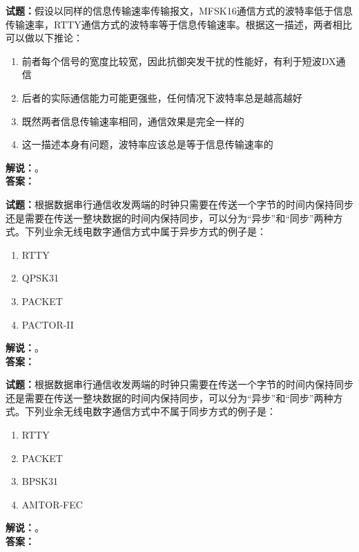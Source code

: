 \documentclass{ctexbook}
\begin{document}
\noindent\textbf{试题：}假设以同样的信息传输速率传输报文，MFSK16通信方式的波特率低于信息传输速率，RTTY通信方式的波特率等于信息传输速率。根据这一描述，两者相比可以做以下推论：
\begin{enumerate}[leftmargin=3em]
  \item 前者每个信号的宽度比较宽，因此抗御突发干扰的性能好，有利于短波DX通信
  \item 后者的实际通信能力可能更强些，任何情况下波特率总是越高越好
  \item 既然两者信息传输速率相同，通信效果是完全一样的
  \item 这一描述本身有问题，波特率应该总是等于信息传输速率的
\end{enumerate}
\noindent\textbf{解说：}\textbf{}。\\\noindent\textbf{答案：}

\vspace{\baselineskip}

\noindent\textbf{试题：}根据数据串行通信收发两端的时钟只需要在传送一个字节的时间内保持同步还是需要在传送一整块数据的时间内保持同步，可以分为“异步”和“同步”两种方式。下列业余无线电数字通信方式中属于异步方式的例子是：
\begin{enumerate}[leftmargin=3em]
  \item RTTY
  \item QPSK31
  \item PACKET
  \item PACTOR-II
\end{enumerate}
\noindent\textbf{解说：}\textbf{}。\\\noindent\textbf{答案：}

\vspace{\baselineskip}

\noindent\textbf{试题：}根据数据串行通信收发两端的时钟只需要在传送一个字节的时间内保持同步还是需要在传送一整块数据的时间内保持同步，可以分为“异步”和“同步”两种方式。下列业余无线电数字通信方式中不属于同步方式的例子是：
\begin{enumerate}[leftmargin=3em]
  \item RTTY
  \item PACKET
  \item BPSK31
  \item AMTOR-FEC
\end{enumerate}
\noindent\textbf{解说：}\textbf{}。\\\noindent\textbf{答案：}

\vspace{\baselineskip}
\end{document}
